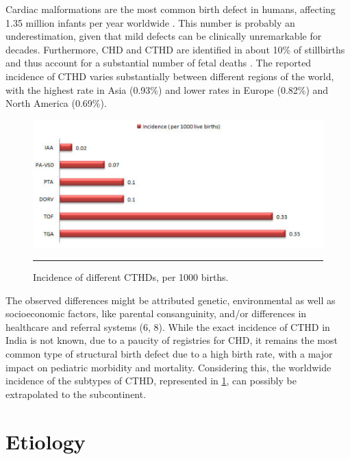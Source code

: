 \begin{refsection}
Cardiac malformations are the most common birth defect in humans, affecting 1.35 million infants per year worldwide \cite{van2011birth}. This number is probably an underestimation, given that mild defects can be clinically unremarkable for decades. Furthermore, CHD and CTHD are identified in about 10\% of stillbirths and thus account for a substantial number of fetal deaths \cite{hoffman1995incidence,fahed2013genetics}. The reported incidence of CTHD varies substantially between different regions of the world, with the highest rate in Asia (0.93\%) and lower rates in Europe (0.82\%) and North America (0.69\%). 

\begin{figure}[!tb]
\centering
\includegraphics[scale=0.65,keepaspectratio]{Figures/Figure1_3.pdf}
\rule{35em}{0.5pt}
\caption{Incidence of different CTHDs, per 1000 births. \cite{hoffman1995incidence}}
\label{fig:1_3}
\end{figure}

The observed differences might be attributed genetic, environmental as well as socioeconomic factors, like parental consanguinity, and/or differences in healthcare and referral systems (6, 8). While the exact incidence of CTHD in India is not known, due to a paucity of registries for CHD, it remains the most common type of structural birth defect due to a high birth rate, with a major impact on pediatric morbidity and mortality. Considering this, the worldwide incidence of the subtypes of CTHD, represented in \cref{fig:1_3}, can possibly be extrapolated to the subcontinent.

\section{Etiology}


\end{refsection}
